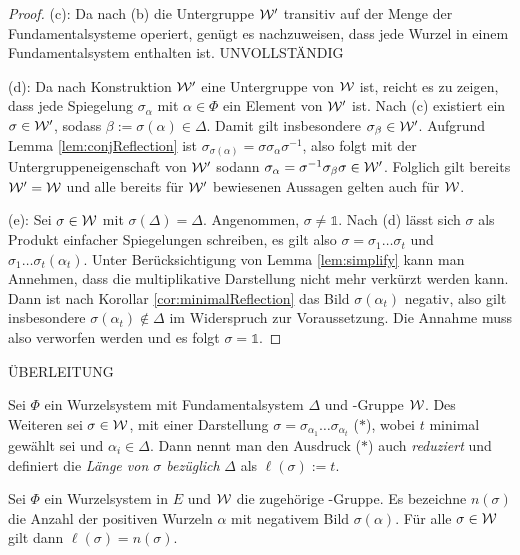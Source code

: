 \begin{proof}
  (c):
  Da nach (b) die Untergruppe $\mathcal{W}'$ transitiv auf der Menge der Fundamentalsysteme operiert, genügt es nachzuweisen, dass jede Wurzel in einem Fundamentalsystem enthalten ist.
  UNVOLLSTÄNDIG

  (d):
  Da nach Konstruktion $\mathcal{W}'$ eine Untergruppe von $\mathcal{W}$ ist, reicht es zu zeigen, dass jede Spiegelung $\sigma_\alpha$ mit $\alpha \in \Phi$ ein Element von $\mathcal{W}'$ ist.
  Nach (c) existiert ein $\sigma \in \mathcal{W}'$, sodass $\beta := \sigma(\alpha) \in \Delta$.
  Damit gilt insbesondere $\sigma_\beta \in \mathcal{W}'$.
  Aufgrund Lemma \ref{lem:conjReflection} ist $\sigma_{\sigma(\alpha)} = \sigma \sigma_\alpha \sigma^{-1}$, also folgt mit der Untergruppeneigenschaft von $\mathcal{W}'$ sodann $\sigma_\alpha = \sigma^{-1} \sigma_\beta \sigma \in \mathcal{W}'$.
  Folglich gilt bereits $\mathcal{W}' = \mathcal{W}$ und alle bereits für $\mathcal{W}'$ bewiesenen Aussagen gelten auch für $\mathcal{W}$.

  (e):
  Sei $\sigma \in \mathcal{W}$ mit $\sigma(\Delta) = \Delta$.
  Angenommen, $\sigma \neq \mathds{1}$.
  Nach (d) lässt sich $\sigma$ als Produkt einfacher Spiegelungen schreiben, es gilt also $\sigma = \sigma_1\dots\sigma_t$ und $\sigma_1 \dots \sigma_t(\alpha_t)$. 
  Unter Berücksichtigung von Lemma \ref{lem:simplify} kann man Annehmen, dass die multiplikative Darstellung nicht mehr verkürzt werden kann.
  Dann ist nach Korollar \ref{cor:minimalReflection} das Bild $\sigma(\alpha_t)$ negativ, also gilt insbesondere $\sigma(\alpha_t) \not\in \Delta$ im Widerspruch zur Voraussetzung.
  Die Annahme muss also verworfen werden und es folgt $\sigma = \mathds{1}$.
\end{proof}

ÜBERLEITUNG

\begin{defn}
  Sei $\Phi$ ein Wurzelsystem mit Fundamentalsystem $\Delta$ und \weyl\hyp{}Gruppe $\mathcal{W}$. 
  Des Weiteren sei $\sigma \in \mathcal{W}$, mit einer Darstellung $\sigma = \sigma_{\alpha_1}\dots\sigma_{\alpha_t}$ ($\ast$), wobei $t$ minimal gewählt sei und $\alpha_i \in \Delta$. 
  Dann nennt man den Ausdruck ($\ast$) auch \emph{reduziert} und definiert die \emph{Länge von $\sigma$ bezüglich} $\Delta$ als $\ell(\sigma) := t$.
\end{defn}

\begin{lem}
  Sei $\Phi$ ein Wurzelsystem in $E$ und $\mathcal{W}$ die zugehörige \weyl\hyp{}Gruppe.
  Es bezeichne $n(\sigma)$ die Anzahl der positiven Wurzeln $\alpha$ mit negativem Bild $\sigma(\alpha)$.
  Für alle $\sigma \in \mathcal{W}$ gilt dann $\ell(\sigma) = n(\sigma)$.
\end{lem}

